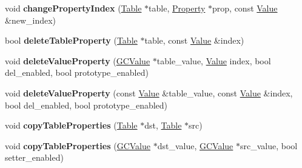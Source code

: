 \begin{DoxyCompactItemize}
\item 
void {\bfseries change\+Property\+Index} (\hyperlink{struct_object_script_1_1_o_s_1_1_core_1_1_table}{Table} $\ast$table, \hyperlink{struct_object_script_1_1_o_s_1_1_core_1_1_property}{Property} $\ast$prop, const \hyperlink{struct_object_script_1_1_o_s_1_1_core_1_1_value}{Value} \&new\+\_\+index)\hypertarget{class_object_script_1_1_o_s_1_1_core_a26ee89f7c532aff37cb8a99602a846ef}{}\label{class_object_script_1_1_o_s_1_1_core_a26ee89f7c532aff37cb8a99602a846ef}

\item 
bool {\bfseries delete\+Table\+Property} (\hyperlink{struct_object_script_1_1_o_s_1_1_core_1_1_table}{Table} $\ast$table, const \hyperlink{struct_object_script_1_1_o_s_1_1_core_1_1_value}{Value} \&index)\hypertarget{class_object_script_1_1_o_s_1_1_core_a1c86630a6e24b4e7d0a257bdcab896b5}{}\label{class_object_script_1_1_o_s_1_1_core_a1c86630a6e24b4e7d0a257bdcab896b5}

\item 
void {\bfseries delete\+Value\+Property} (\hyperlink{struct_object_script_1_1_o_s_1_1_core_1_1_g_c_value}{G\+C\+Value} $\ast$table\+\_\+value, \hyperlink{struct_object_script_1_1_o_s_1_1_core_1_1_value}{Value} index, bool del\+\_\+enabled, bool prototype\+\_\+enabled)\hypertarget{class_object_script_1_1_o_s_1_1_core_a00ba1ffd46942bd452139242b7ccca35}{}\label{class_object_script_1_1_o_s_1_1_core_a00ba1ffd46942bd452139242b7ccca35}

\item 
void {\bfseries delete\+Value\+Property} (const \hyperlink{struct_object_script_1_1_o_s_1_1_core_1_1_value}{Value} \&table\+\_\+value, const \hyperlink{struct_object_script_1_1_o_s_1_1_core_1_1_value}{Value} \&index, bool del\+\_\+enabled, bool prototype\+\_\+enabled)\hypertarget{class_object_script_1_1_o_s_1_1_core_a6e0bd5b25bcdbfc9372d51a768df1d1a}{}\label{class_object_script_1_1_o_s_1_1_core_a6e0bd5b25bcdbfc9372d51a768df1d1a}

\item 
void {\bfseries copy\+Table\+Properties} (\hyperlink{struct_object_script_1_1_o_s_1_1_core_1_1_table}{Table} $\ast$dst, \hyperlink{struct_object_script_1_1_o_s_1_1_core_1_1_table}{Table} $\ast$src)\hypertarget{class_object_script_1_1_o_s_1_1_core_ad4727b6088a08ecf0e8881a967ad83c1}{}\label{class_object_script_1_1_o_s_1_1_core_ad4727b6088a08ecf0e8881a967ad83c1}

\item 
void {\bfseries copy\+Table\+Properties} (\hyperlink{struct_object_script_1_1_o_s_1_1_core_1_1_g_c_value}{G\+C\+Value} $\ast$dst\+\_\+value, \hyperlink{struct_object_script_1_1_o_s_1_1_core_1_1_g_c_value}{G\+C\+Value} $\ast$src\+\_\+value, bool setter\+\_\+enabled)\hypertarget{class_object_script_1_1_o_s_1_1_core_ac3b621868c27b57b0ebc17e559af0330}{}\label{class_object_script_1_1_o_s_1_1_core_ac3b621868c27b57b0ebc17e559af0330}


\end{DoxyCompactItemize}
